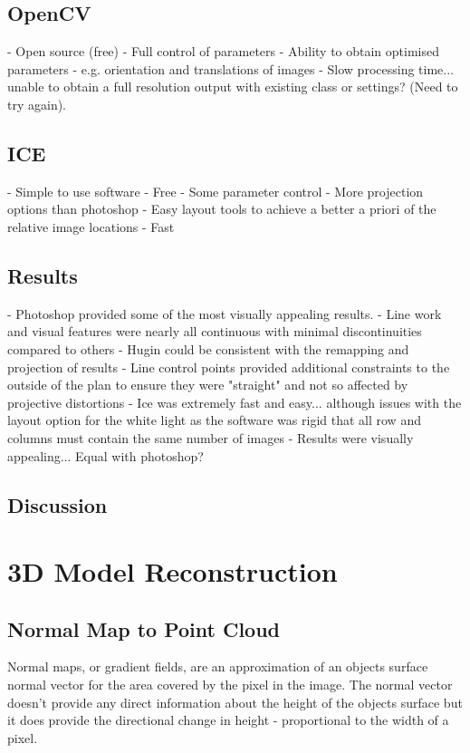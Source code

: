 	\subsection{OpenCV}
	\label{sec:OpenCv}
	- Open source (free)
	- Full control of parameters
	- Ability to obtain optimised parameters - e.g. orientation and translations of images
	- Slow processing time... unable to obtain a full resolution output with existing class or settings?
	(Need to try again).

	\subsection{ICE}
	\label{sec:Ice}
	- Simple to use software
	- Free 
	- Some parameter control
		- More projection options than photoshop
	- Easy layout tools to achieve a better a priori of the relative image locations
	- Fast
	
	\subsection{Results}
	\label{sec:ResultsStitching}
	- Photoshop provided some of the most visually appealing results.
		- Line work and visual features were nearly all continuous with minimal discontinuities compared to others
	- Hugin could be consistent with the remapping and projection of results
		- Line control points provided additional constraints to the outside of the plan to ensure they were "straight" and not so affected by projective distortions
	- Ice was extremely fast and easy... although issues with the layout option for the white light as the software was rigid that all row and columns must contain the same number of images
	- Results were visually appealing... Equal with photoshop?

	\subsection{Discussion}
	\label{sec:DiscussionStitching}

\section{3D Model Reconstruction}
\label{sec:ModelReconstruction}

	\subsection{Normal Map to Point Cloud}
	\label{sec:Normal2Pts}
	Normal maps, or gradient fields, are an approximation of an objects surface normal vector for the area covered by the pixel in the image. The normal vector doesn't provide any direct information about the height of the objects surface but it does provide the directional change in height - proportional to the width of a pixel.
	
